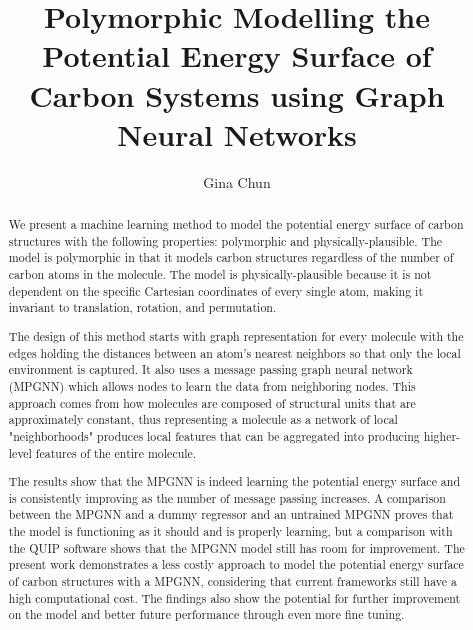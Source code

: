 \documentclass[12pt, abstract = true]{scrartcl}
\title{Polymorphic Modelling the Potential Energy Surface of Carbon Systems using Graph Neural Networks}
\author{Gina Chun}
\begin{document}
\maketitle

\newpage

\begin{abstract}

We present a machine learning method to model the potential energy surface of carbon structures with the following properties: polymorphic and physically-plausible. The model is polymorphic in that it models carbon structures regardless of the number of carbon atoms in the molecule. The model is physically-plausible because it is not dependent on the specific Cartesian coordinates of every single atom, making it invariant to translation, rotation, and permutation. 

The design of this method starts with graph representation for every molecule with the edges holding the distances between an atom's nearest neighbors so that only the local environment is captured. It also uses a message passing graph neural network (MPGNN) which allows nodes to learn the data from neighboring nodes. This approach comes from how molecules are composed of structural units that are approximately constant, thus representing a molecule as a network of local "neighborhoods" produces local features that can be aggregated into producing higher-level features of the entire molecule. 

The results show that the MPGNN is indeed learning the potential energy surface and is consistently improving as the number of message passing increases. A comparison between the MPGNN and a dummy regressor and an untrained MPGNN proves that the model is functioning as it should and is properly learning, but a comparison with the QUIP software shows that the MPGNN model still has room for improvement. The present work demonstrates a less costly approach to model the potential energy surface of carbon structures with a MPGNN, considering that current frameworks still have a high computational cost. The findings also show the potential for further improvement on the model and better future performance through even more fine tuning.
  
\end{abstract}

\newpage

\tableofcontents
\end{document}
